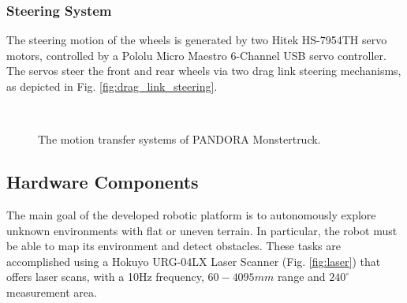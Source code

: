 \documentclass[conference]{IEEEtran}
\begin{document}
\subsubsection{Steering System}
The steering motion of the wheels is generated by two Hitek HS-7954TH servo motors, controlled by a Pololu Micro Maestro 6-Channel USB servo controller. The servos steer the front and rear wheels via two drag link steering mechanisms, as depicted in Fig. \ref{fig:drag_link_steering}.

\begin{figure}[!ht]
	\centering
	\\[-0.05cm]
	\caption{The motion transfer systems of PANDORA Monstertruck.}
\end{figure}

\subsection{Hardware Components}
The main goal of the developed robotic platform is to autonomously explore unknown environments with flat or uneven terrain. In particular, the robot must be able to map its environment and detect obstacles. These tasks are accomplished using a Hokuyo URG-04LX Laser Scanner (Fig. \ref{fig:laser}) that offers laser scans, with a 10Hz frequency, $60-4095mm$ range and $240^\circ$ measurement area.
\end{document}
